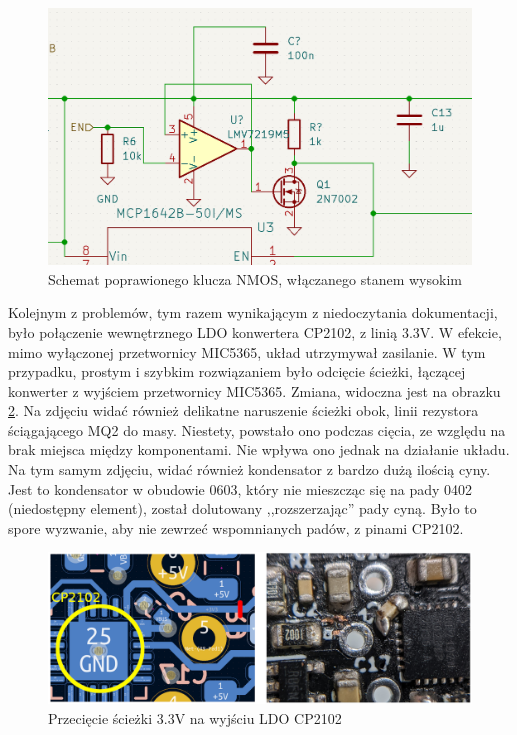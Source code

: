 \begin{figure}[H]
    \centering
    \includegraphics[width=\textwidth, height=\textheight, keepaspectratio]{Graphics/fix_gate_3.png}
    \caption{Schemat poprawionego klucza NMOS, włączanego stanem wysokim}
    \label{img:fix_gate_3}
\end{figure}

Kolejnym z problemów, tym razem wynikającym z niedoczytania dokumentacji, było połączenie wewnętrznego LDO konwertera CP2102, z linią 3.3V. W efekcie, mimo wyłączonej przetwornicy MIC5365, układ utrzymywał zasilanie. W tym przypadku, prostym i szybkim rozwiązaniem było odcięcie ścieżki, łączącej konwerter z wyjściem przetwornicy MIC5365. Zmiana, widoczna jest na obrazku \ref{img:fix_ldo_cp}. Na zdjęciu widać również delikatne naruszenie ścieżki obok, linii rezystora ściągającego MQ2 do masy. Niestety, powstało ono podczas cięcia, ze względu na brak miejsca między komponentami. Nie wpływa ono jednak na działanie układu. Na tym samym zdjęciu, widać również kondensator z bardzo dużą ilością cyny. Jest to kondensator w obudowie 0603, który nie mieszcząc się na pady 0402 (niedostępny element), został dolutowany ,,rozszerzając'' pady cyną. Było to spore wyzwanie, aby nie zewrzeć wspomnianych padów, z pinami CP2102.
\begin{figure}[H]
    \centering
    \includegraphics[width=\textwidth, height=\textheight, keepaspectratio]{Graphics/fix_ldo_cp.png}
    \caption{Przecięcie ścieżki 3.3V na wyjściu LDO CP2102}
    \label{img:fix_ldo_cp}
\end{figure}

